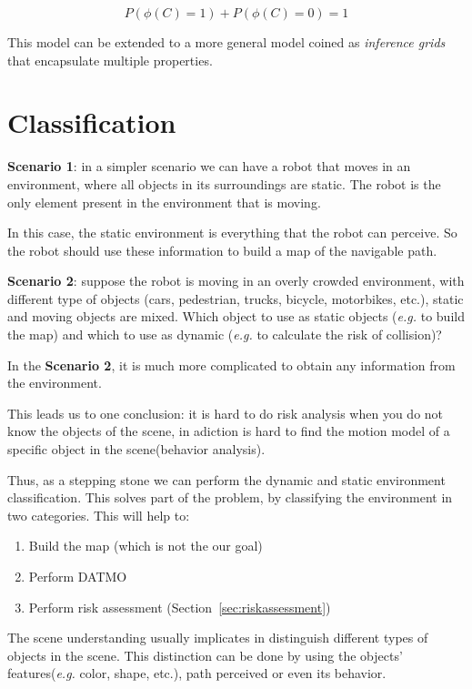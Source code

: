 \begin{equation}
P(\phi(C)=1) + P(\phi(C)=0) = 1
\label{eq:binarycell}
\end{equation}

This model can be extended to a more general model coined as \textit{inference grids} that encapsulate multiple properties\cite{Elfes:1989:OGP:916528}.

\section{Classification}

\textbf{Scenario 1}: in a simpler scenario we can have a robot that moves in an environment, where all objects in its surroundings are static. The robot is the only element present in the environment that is moving.

In this case, the static environment is everything that the robot can perceive. So the robot should use these information to build a map of the navigable path.

\textbf{Scenario 2}: suppose the robot is moving in an overly crowded environment, with different type of objects (cars, pedestrian, trucks, bicycle, motorbikes, etc.), static and moving objects are mixed. Which object to use as static objects (\textit{e.g.} to build the map) and which to use as dynamic (\textit{e.g.} to calculate the risk of collision)? 

In the \textbf{Scenario 2}, it is much more complicated to obtain any information from the environment.

This leads us to one conclusion: it is hard to do risk analysis when you do not know the objects of the scene, in adiction is hard to find the motion model of a specific object in the scene(behavior analysis).

Thus, as a stepping stone we can perform the dynamic and static environment classification. This solves part of the problem, by classifying the environment in two categories. This will help to:

\begin{enumerate}
\item Build the map (which is not the our goal)
\item Perform DATMO
\item Perform risk assessment (Section~\ref{sec:riskassessment})
\end{enumerate}

The scene understanding usually implicates in distinguish different types of objects in the scene. This distinction can be done by using the objects' features(\textit{e.g.} color, shape, etc.), path perceived or even its behavior. 

